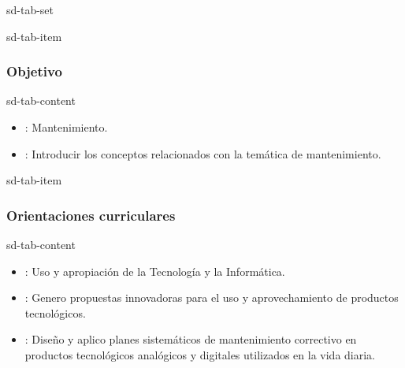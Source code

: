 \documentclass[letterpaper,10pt,spanish]{sphinxmanual}
\begin{document}
\begin{sphinxuseclass}{sd-tab-set}
\begin{sphinxuseclass}{sd-tab-item}\subsubsection*{Objetivo}

\begin{sphinxuseclass}{sd-tab-content}
\sphinxAtStartPar
{}
\begin{itemize}
\item {} 
\sphinxAtStartPar
{}: Mantenimiento.

\item {} 
\sphinxAtStartPar
{}: Introducir los conceptos relacionados con la temática de mantenimiento.

\end{itemize}

\end{sphinxuseclass}
\end{sphinxuseclass}
\begin{sphinxuseclass}{sd-tab-item}\subsubsection*{Orientaciones curriculares}

\begin{sphinxuseclass}{sd-tab-content}\begin{itemize}
\item {} 
\sphinxAtStartPar
{}: Uso y apropiación de la Tecnología y la Informática.

\item {} 
\sphinxAtStartPar
{}: Genero propuestas innovadoras para el uso y aprovechamiento de productos tecnológicos.

\item {} 
\sphinxAtStartPar
{}: Diseño y aplico planes sistemáticos de mantenimiento correctivo en productos tecnológicos analógicos y digitales utilizados en la vida diaria.


\end{itemize}
\end{sphinxuseclass}
\end{sphinxuseclass}
\end{sphinxuseclass}
\end{document}
